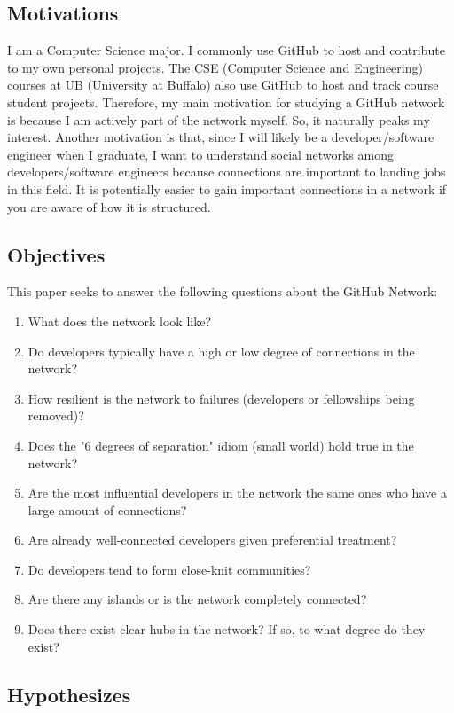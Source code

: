 \documentclass[9pt,twocolumn,twoside]{pnas-new}
\begin{document}
\subsection*{Motivations} I am a Computer Science major. I commonly use GitHub to host and contribute to my own personal projects. The CSE (Computer Science and Engineering) courses at UB (University at Buffalo) also use GitHub to host and track course student projects. Therefore, my main motivation for studying a GitHub network is because I am actively part of the network myself.  So, it naturally peaks my interest. Another motivation is that, since I will likely be a developer/software engineer when I graduate, I want to understand social networks among developers/software engineers because connections are important to landing jobs in this field. It is potentially easier to gain important connections in a network if you are aware of how it is structured. 

\subsection*{Objectives} This paper seeks to answer the following questions about the GitHub Network:

\begin{enumerate}
  \item What does the network look like?
  \item Do developers typically have a high or low degree of connections in the network?
  \item How resilient is the network to failures (developers or fellowships being removed)?
  \item Does the "6 degrees of separation" idiom (small world) hold true in the network?
  \item Are the most influential developers in the network the same ones who have a large amount of connections?
  \item Are already well-connected developers given preferential treatment?
  \item Do developers tend to form close-knit communities?
  \item Are there any islands or is the network completely connected?
  \item Does there exist clear hubs in the network? If so, to what degree do they exist?
\end{enumerate}

\subsection*{Hypothesizes} 
\end{document}
